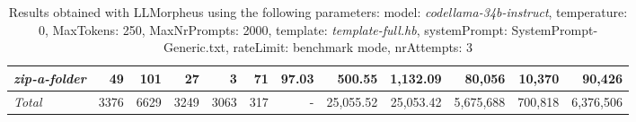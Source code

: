 \begin{table*}
{\begin{tabular}{l||r|r|r|r|r|r||r|r||r|r|r}
   \hline
   \textit{zip-a-folder} & 49 & 101 & 27 & 3 & 71 & 97.03 & 500.55 & 1,132.09 & 80,056 & 10,370 & 90,426 \\ 
   \hline
   \textit{Total} & 3376 & 6629 & 3249 & 3063 & 317 & - & 25,055.52  & 25,053.42 & 5,675,688 & 700,818 & 6,376,506 \\ 
 \end{tabular}
 }
 \caption{Results obtained with LLMorpheus using the following parameters: 
   model: \textit{codellama-34b-instruct}, 
   temperature: 0, 
   MaxTokens: 250, 
   MaxNrPrompts: 2000, 
   template: \textit{template-full.hb}, 
   systemPrompt: SystemPrompt-Generic.txt, 
   rateLimit: benchmark mode, 
   nrAttempts: 3  
 }
\end{table*}

